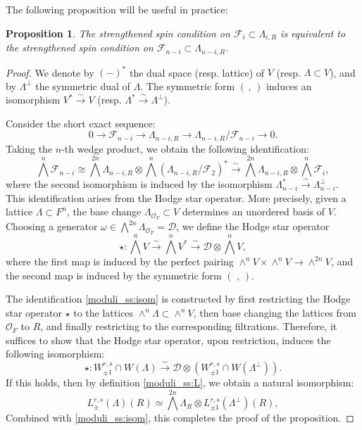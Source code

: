 \documentclass[pdflatex,sn-mathphys-num]{sn-jnl}%
\theoremstyle{thmstyleone}%
\newtheorem{proposition}[subsubsection]{Proposition}%
\theoremstyle{thmstyletwo}%
\numberwithin{equation}{subsection}
\theoremstyle{thmstylethree}%
\newcommand{\CD}{\ensuremath{\mathcal{D}}\xspace}
\newcommand{\CF}{\ensuremath{\mathcal{F}}\xspace}
\newcommand{\CO}{\ensuremath{\mathcal{O}}\xspace}
\newcommand{\sform}{\ensuremath{(\text{~,~})}\xspace}
\begin{document}
The following proposition will be useful in practice:
\begin{proposition}\label{moduli_ss:dual}
    The strengthened spin condition on $\CF_i\subset \Lambda_{i,R}$ is equivalent to the strengthened spin condition on $\CF_{n-i}\subset\Lambda_{n-i,R}$.
\end{proposition}
\begin{proof}
We denote by $(-)^*$ the dual space (resp. lattice) of $V$ (resp. $\Lambda\subset V$), and by $\Lambda^\perp$ the symmetric dual of $\Lambda$. The symmetric form $(\,,\,)$ induces an isomorphism $V^*\xrightarrow{\sim}V$ (resp. $\Lambda^*\xrightarrow{\sim} \Lambda^\perp$).

    Consider the short exact sequence:
\begin{equation*}
    0\rightarrow\CF_{n-i}\rightarrow\Lambda_{n-i,R}\rightarrow\Lambda_{n-i,R}/\CF_{n-i}\rightarrow 0.
\end{equation*}
Taking the $n$-th wedge product, we obtain the following identification:
\begin{equation}\label{moduli_ss:isom}
    \bigwedge^n\CF_{n-i}\cong\bigwedge^{2n}\Lambda_{n-i,R}\otimes \bigwedge^{n}(\Lambda_{n-i,R}/\CF_2)^*\xrightarrow{\sim}\bigwedge^{2n}\Lambda_{n-i,R}\otimes \bigwedge^n \CF_i,
\end{equation}
where the second isomorphism is induced by the isomorphism $\Lambda_{n-i}^*\xrightarrow{\sim}\Lambda_{n-i}^\perp$. 
This identification arises from the Hodge star operator. More precisely, given a lattice $\Lambda\subset F^n$, the base change $\Lambda_{\CO_F}\subset V$ determines an unordered basis of $V$. Choosing a generator $\omega\in\bigwedge^{2n}\Lambda_{\CO_F}=\CD$, we define the Hodge star operator
\begin{equation*}
    \star:\bigwedge^n V\xrightarrow{\sim}\bigwedge^n V^*\xrightarrow{\sim}
    \CD\otimes \bigwedge^n V,
\end{equation*}
where the first map is induced by the perfect pairing $\wedge^nV\times \wedge^n V\rightarrow \wedge^{2n}V$, and the second map is induced by the symmetric form $\sform$.
 
The identification \eqref{moduli_ss:isom} is constructed by first restricting the Hodge star operator $\star$ to the lattices $\wedge^n\Lambda\subset \wedge^n V$, then base changing the lattices from $\CO_F$ to $R$, and finally restricting to the corresponding filtrations.
Therefore, it suffices to show that the Hodge star operator, upon restriction, induces the following isomorphism:
\begin{equation}\label{moduli_ss:isom2}
    \star:  W^{r,s}_{\pm 1}\cap W(\Lambda)\xrightarrow{\sim} \CD\otimes\left(W^{r,s}_{\pm 1}\cap W(\Lambda^\perp)\right).
\end{equation}
If this holds, then by definition \eqref{moduli_ss:L}, we obtain a natural isomorphism:
\begin{equation*}
    L^{r,s}_{\pm}(\Lambda)(R)\simeq \bigwedge^{2n}\Lambda_{R}\otimes L^{r,s}_{\pm 1}(\Lambda^\perp)(R),
\end{equation*}
Combined with \eqref{moduli_ss:isom}, this completes the proof of the proposition.


\end{proof}
\end{document}
